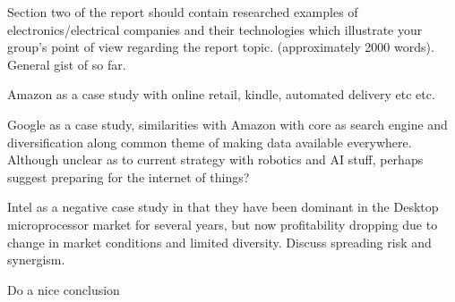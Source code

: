 Section two of the report should contain researched examples of electronics/electrical companies and their technologies which illustrate your group’s point of view regarding the report topic.   (approximately 2000 words).
General gist of so far.

Amazon as a case study with online retail, kindle, automated delivery etc etc.

Google as a case study, similarities with Amazon with core as search engine and diversification along common theme of making data available everywhere. Although unclear as to current strategy with robotics and AI stuff, perhaps suggest preparing for the internet of things?

Intel as a negative case study in that they have been dominant in the Desktop microprocessor market for several years, but now profitability dropping due to change in market conditions and limited diversity. Discuss spreading risk and synergism.

Do a nice conclusion



